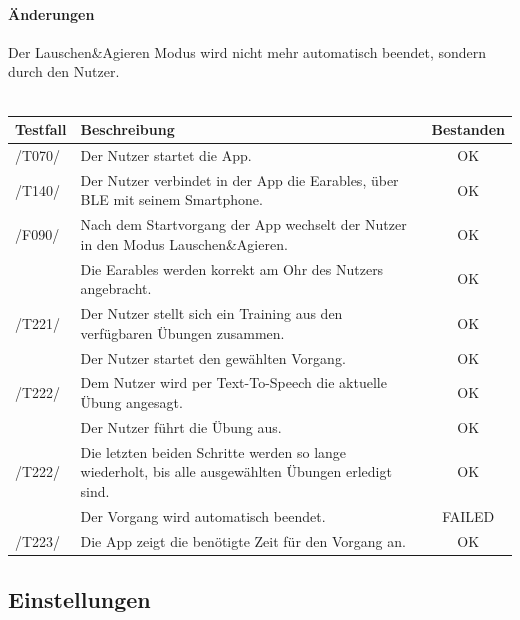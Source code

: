 \documentclass[a4paper,12pt]{article}
\newcommand{\testok}[0]{
	\cellcolor{green!25} OK
}
\newcommand{\testfailed}[0]{
	\cellcolor{red!25} FAILED
}
\begin{document}
\paragraph{Änderungen}
Der Lauschen\&Agieren Modus wird nicht mehr automatisch beendet, sondern durch den Nutzer.  
\\
\\
\begin{tabular}{ |p{1.5cm} | p{12cm} | c| }
	\hline
	\textbf{Testfall} & \textbf{Beschreibung} & \textbf{Bestanden}\\
	\hline
	/T070/ & Der Nutzer startet die App. & \testok \\
	\hline
	/T140/ & Der Nutzer verbindet in der App die Earables, über BLE mit seinem Smartphone. & \testok  \\
	\hline
	/F090/ & Nach dem Startvorgang der App wechselt der Nutzer in den Modus \glqq Lauschen\&Agieren\grqq . & \testok  \\
	\hline
	& Die Earables werden korrekt am Ohr des Nutzers angebracht. & \testok  \\
	\hline
	/T221/ & Der Nutzer stellt sich ein Training aus den verfügbaren Übungen zusammen. & \testok  \\
	\hline
	& Der Nutzer startet den gewählten Vorgang. & \testok  \\
	\hline
	/T222/ & Dem Nutzer wird per Text-To-Speech die aktuelle Übung angesagt. & \testok  \\
	\hline
	& Der Nutzer führt die Übung aus. & \testok  \\
	\hline
	/T222/ & Die letzten beiden Schritte werden so lange wiederholt, bis alle ausgewählten Übungen erledigt sind. & \testok  \\
	\hline
	& Der Vorgang wird automatisch beendet. & \testfailed \\
	\hline
	/T223/ & Die App zeigt die benötigte Zeit für den Vorgang an. & \testok  \\
	\hline
\end{tabular}
\subsection{Einstellungen}
\end{document}
